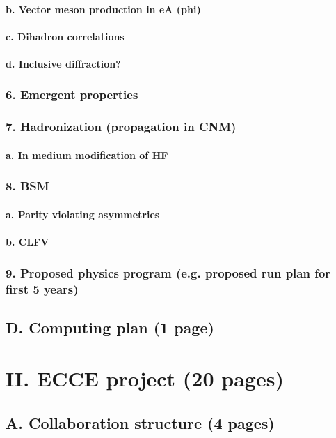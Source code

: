 \documentclass{report}
\begin{document}
\subsubsection{b. Vector meson production in eA (phi)}
\subsubsection{c. Dihadron correlations}
\subsubsection{d. Inclusive diffraction?}
\subsection{6. Emergent properties}
\subsection{7. Hadronization (propagation in CNM)}
\subsubsection{a. In medium modification of HF}
\newpage
\subsection{8. BSM}
\subsubsection{a. Parity violating asymmetries}
\subsubsection{b. CLFV}
\subsection{9. Proposed physics program (e.g. proposed run plan for first 5 years)}
\section{D. Computing plan (1 page)}
%
\chapter{II. ECCE project (20 pages)}
%
\section{A. Collaboration structure (4 pages)}
\end{document}
